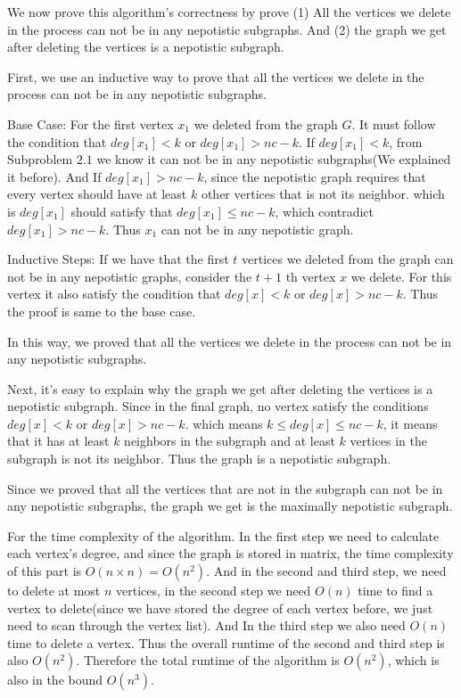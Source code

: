 \documentclass{article}
\begin{document}
\begin{Question}
\begin{Subquestion}
\begin{answer}
We now prove this algorithm's correctness by prove (1) All the vertices we delete 
in the process can not be in any nepotistic subgraphs. And (2) the graph we get after 
deleting the vertices is a nepotistic subgraph.

First, we use an inductive way to prove that all the vertices we delete 
in the process can not be in any nepotistic subgraphs.

Base Case: For the first vertex $x_1$ we deleted from the graph $G$. It must follow the condition
 that $deg[x_1] < k$ or $deg[x_1] > nc - k$. If $deg[x_1] < k$, from Subproblem $2.1$ we know it can not 
 be in any nepotistic subgraphs(We explained it before). And If $deg[x_1] > nc - k$, since the nepotistic
 graph requires that every vertex should have at least $k$ other vertices that is not its neighbor. which is 
 $deg[x_1]$ should satisfy that $deg[x_1] \le nc - k$, which contradict $deg[x_1] > nc - k$. Thus
 $x_1$ can not be in any nepotistic graph.

Inductive Steps: If we have that the first $t$ vertices we deleted from the graph can not be in any
nepotistic graphs, consider the $t + 1$ th vertex $x$ we delete. For this vertex it also satisfy the condition 
that $deg[x] < k$ or $deg[x] > nc - k$. Thus the proof is same to the base case. 

In this way, we proved that all the vertices we delete 
in the process can not be in any nepotistic subgraphs.

Next, it's easy to explain why the graph we get after 
deleting the vertices is a nepotistic subgraph. Since in the final graph, no vertex
satisfy the conditions $deg[x] < k$ or $deg[x] > nc - k$. which means $k \le deg[x] \le nc - k$, 
it means that it has at least $k$ neighbors in the subgraph and at least $k$ vertices in 
the subgraph is not its neighbor. Thus the graph is a nepotistic subgraph.

Since we proved that all the vertices that are not in the subgraph can not be in any nepotistic subgraphs,
the graph we get is the maximally nepotistic subgraph.

For the time complexity of the algorithm. In the first step we need to calculate each 
vertex's degree, and since the graph is stored in matrix, the time complexity of this part is 
$O(n\times n) = O(n^2)$. And in the second and third step, we need to delete at most $n$ vertices,
in the second step we need $O(n)$ time to find a vertex to delete(since we have stored the degree of each 
vertex before, we just need to scan through the vertex list). And In the third step we also need $O(n)$ time 
to delete a vertex. Thus the overall runtime of the second and third step is also $O(n^2)$. Therefore the total 
runtime of the algorithm is $O(n^2)$, which is also in the bound $O(n^3)$.
\end{answer}

\end{Subquestion}

\end{Question}
\end{document}
